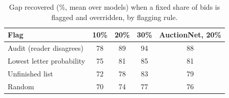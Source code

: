 \begin{table}[t]
\caption{Gap recovered (\%, mean over models) when a fixed share of bids is flagged and overridden, by flagging rule.}
\label{tab:flagrate}
\small
\centering

\begin{tabular}{lcccc}
\toprule
Flag & 10\% & 20\% & 30\% & AuctionNet, 20\% \\
\midrule
Audit (reader disagrees) & 78 & 89 & 94 & 88 \\
Lowest letter probability & 75 & 81 & 85 & 81 \\
Unfinished list & 72 & 78 & 83 & 79 \\
Random & 70 & 74 & 77 & 76 \\
\bottomrule
\end{tabular}
\end{table}
